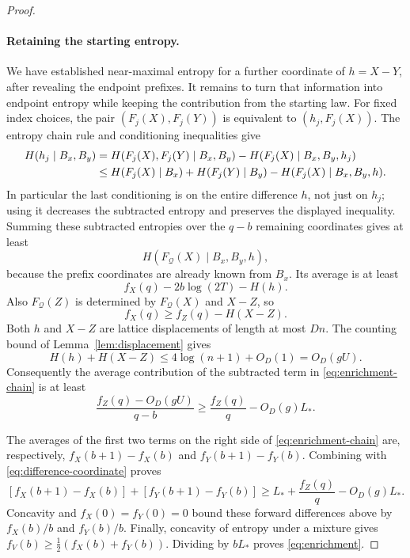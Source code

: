 \begin{proof}
\paragraph{Retaining the starting entropy.}
We have established near-maximal entropy for a further coordinate of
\(h=X-Y\), after revealing the endpoint prefixes.
It remains to turn that information into endpoint entropy while keeping
the contribution from the starting law.
For fixed index choices, the pair
\((F_j(X),F_j(Y))\) is equivalent to \((h_j,F_j(X))\).
The entropy chain rule and conditioning inequalities give
\begin{align}
 H(h_j\mid B_x,B_y)
 &=H(F_j(X),F_j(Y)\mid B_x,B_y)
       -H(F_j(X)\mid B_x,B_y,h_j) \notag\\
 &\le H(F_j(X)\mid B_x)+H(F_j(Y)\mid B_y)
       -H(F_j(X)\mid B_x,B_y,h).
 \label{eq:enrichment-chain}
\end{align}
In particular the last conditioning is on the entire difference
\(h\), not just on \(h_j\); using it decreases the subtracted
entropy and preserves the displayed inequality.
Summing these subtracted entropies over the \(q-b\) remaining
coordinates gives at least
\[
 H(F_{\mathcal Q}(X)\mid B_x,B_y,h),
\]
because the prefix coordinates are already known from \(B_x\).
Its average is at least
\[
 f_X(q)-2b\log(2T)-H(h).
\]
Also \(F_{\mathcal Q}(Z)\) is determined by
\(F_{\mathcal Q}(X)\) and \(X-Z\), so
\[
 f_X(q)\ge f_Z(q)-H(X-Z).
\]
Both \(h\) and \(X-Z\) are lattice displacements of length at most
\(Dn\). The counting bound of Lemma~\ref{lem:displacement} gives
\[
 H(h)+H(X-Z)\le4\log(n+1)+O_D(1)=O_D(gU).
\]
Consequently the average contribution of the subtracted term in
\eqref{eq:enrichment-chain} is at least
\[
 \frac{f_Z(q)-O_D(gU)}{q-b}
 \ge \frac{f_Z(q)}q-O_D(g)L_*.
\]

The averages of the first two terms on the right side of
\eqref{eq:enrichment-chain} are, respectively,
\(f_X(b+1)-f_X(b)\) and \(f_Y(b+1)-f_Y(b)\).
Combining with \eqref{eq:difference-coordinate} proves
\[
 [f_X(b+1)-f_X(b)]+[f_Y(b+1)-f_Y(b)]
 \ge L_*+\frac{f_Z(q)}q-O_D(g)L_*.
\]
Concavity and \(f_X(0)=f_Y(0)=0\) bound these forward differences
above by \(f_X(b)/b\) and \(f_Y(b)/b\).
Finally, concavity of entropy under a mixture gives
\(f_V(b)\ge\frac12(f_X(b)+f_Y(b))\).
Dividing by \(bL_*\) proves \eqref{eq:enrichment}.
\end{proof}
